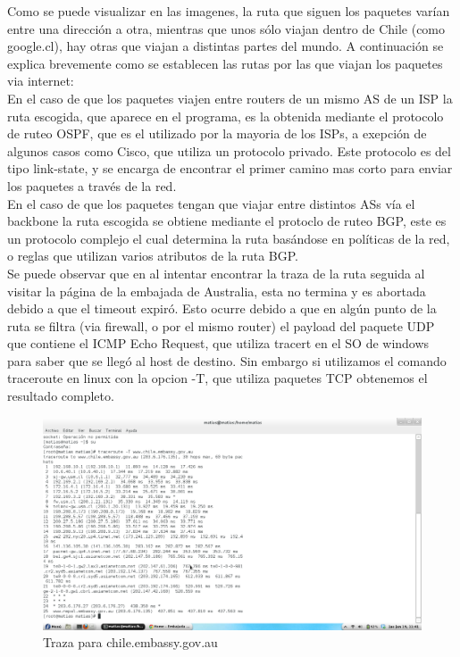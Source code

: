\documentclass[a4paper]{article}
\begin{document}
Como se puede visualizar en las imagenes, la ruta que siguen los paquetes varían entre una dirección a otra, mientras que unos sólo viajan dentro de Chile (como google.cl), hay otras que viajan a distintas partes del mundo. A continuación se explica brevemente como se establecen las rutas por las que viajan los paquetes via internet:\\

En el caso de que los paquetes viajen entre routers de un mismo AS de un ISP la ruta escogida, que aparece en el programa, es la obtenida mediante el protocolo de ruteo OSPF, que es el utilizado por la mayoria de los ISPs, a exepción de algunos casos como Cisco, que utiliza un protocolo privado. Este protocolo es del tipo link-state, y se encarga de encontrar el primer camino mas corto para enviar los paquetes a través de la red.\\

En el caso de que los paquetes tengan que viajar entre distintos ASs vía el backbone la ruta escogida se obtiene mediante el protoclo de ruteo BGP, este es un protocolo complejo el cual determina la ruta basándose en políticas de la red, o reglas que utilizan varios atributos de la ruta BGP.\\

Se puede observar que en al intentar encontrar la traza de la ruta seguida al visitar la página de la embajada de Australia, esta no termina y es abortada debido a que el timeout expiró. Esto ocurre debido a  que en algún punto de la ruta se filtra (via firewall, o por el mismo router) el payload del paquete UDP que contiene el ICMP Echo Request, que utiliza tracert en el SO de windows para saber que se llegó al host de destino. Sin embargo si utilizamos el comando traceroute en linux con la opcion -T, que utiliza paquetes TCP obtenemos el resultado completo.

\begin{figure}[H]
\centering
\includegraphics[width=1\textwidth]{tracerouteEmbassy.png}
\caption{\label{fig:Tembassy}Traza para chile.embassy.gov.au}
\end{figure}
\end{document}
